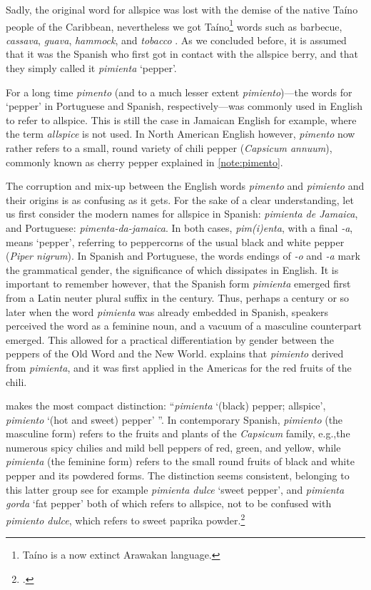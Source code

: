Sadly, the original word for allspice was lost with the demise of the native Taíno people of the Caribbean, nevertheless we got Taíno\footnote{Taíno is a now extinct Arawakan language.} words such as barbecue, \textit{cassava}, \textit{guava}, \textit{hammock}, and \textit{tobacco} \autocite[229]{rafinesque_american_1836}. As we concluded before, it is assumed that it was the Spanish who first got in contact with the allspice berry, and that they simply called it \textit{pimienta} `pepper'.



For a long time \textit{pimento} (and to a much lesser extent \textit{pimiento})---the words for `pepper' in Portuguese and Spanish, respectively---was commonly used in English to refer to allspice. This is still the case in Jamaican English for example, where the term \textit{allspice} is not used. In North American English however, \textit{pimento} now rather refers to a small, round variety of chili pepper (\textit{Capsicum annuum}), commonly known as cherry pepper explained in \cref{note:pimento}. 

The corruption and mix-up between the English words \textit{pimento} and \textit{pimiento} and their origins is as confusing as it gets. For the sake of a clear understanding, let us first consider the modern names for allspice in Spanish: \textit{pimienta de Jamaica}, and Portuguese: \textit{pimenta-da-jamaica}. In both cases, \textit{pim\-(i)enta}, with a final \textit{-a}, means `pepper', referring to peppercorns of the usual black and white pepper (\textit{Piper nigrum}). In Spanish and Portuguese, the words endings of \textit{-o} and \textit{-a} mark the grammatical gender, the significance of which dissipates in English. It is important to remember however, that the Spanish form \textit{pimienta} emerged first from a Latin neuter plural suffix in the  century. Thus, perhaps a century or so later when the word \textit{pimienta} was already embedded in Spanish, speakers perceived the word as a feminine noun, and a vacuum of a masculine counterpart emerged. This allowed for a practical differentiation by gender between the peppers of the Old Word and the New World. \textcite[459]{corominas_breve_1987} explains that \textit{pimiento} derived from \textit{pimienta}, and it was first applied in the Americas for the red fruits of the chili.

\textcite[415]{gomez_de_silva_elseviers_1985} makes the most compact distinction: ``\textit{pimienta} `(black) pepper; allspice', \textit{pimiento} `(hot and sweet) pepper' ''. In contemporary Spanish, \textit{pimiento} (the masculine form) refers to the fruits and plants of the \textit{Capsicum} family, e.g.,the numerous spicy chilies and mild bell peppers of red, green, and yellow, while \textit{pimienta} (the feminine form) refers to the small round fruits of black and white pepper and its powdered forms. The distinction seems consistent, belonging to this latter group see for example \textit{pimienta dulce} `sweet pepper', and \textit{pimienta gorda} `fat pepper' both of which refers to allspice, not to be confused with \textit{pimiento dulce}, which refers to sweet paprika powder.\footcite[pimiento, -a]{dle}

